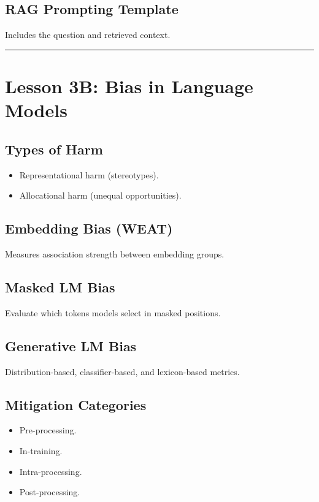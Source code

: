 \documentclass[12pt]{article}
\begin{document}
\subsection*{RAG Prompting Template}
Includes the question and retrieved context.

\bigskip
\hrule
\bigskip

\section*{Lesson 3B: Bias in Language Models}

\subsection*{Types of Harm}
\begin{itemize}
    \item Representational harm (stereotypes).
    \item Allocational harm (unequal opportunities).
\end{itemize}

\subsection*{Embedding Bias (WEAT)}
Measures association strength between embedding groups.

\subsection*{Masked LM Bias}
Evaluate which tokens models select in masked positions.

\subsection*{Generative LM Bias}
Distribution-based, classifier-based, and lexicon-based metrics.

\subsection*{Mitigation Categories}
\begin{itemize}
    \item Pre-processing.
    \item In-training.
    \item Intra-processing.
    \item Post-processing.
\end{itemize}
\end{document}
